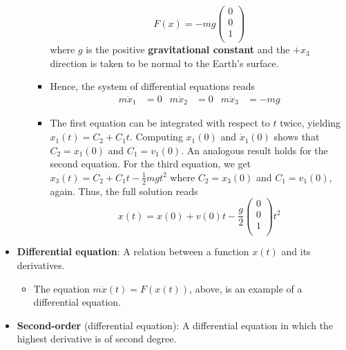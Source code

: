 \documentclass[../notes.tex]{subfiles}
\begin{document}
\begin{itemize}
\begin{itemize}
\begin{itemize}
            \begin{equation*}
                F(x) = -mg
                \begin{pmatrix}
                    0\\
                    0\\
                    1\\
                \end{pmatrix}
            \end{equation*}
            where $g$ is the positive \textbf{gravitational constant} and the $+x_3$ direction is taken to be normal to the Earth's surface.
            \item Hence, the system of differential equations reads
            \begin{align*}
                m\ddot{x}_1 &= 0&
                m\ddot{x}_2 &= 0&
                m\ddot{x}_3 &= -mg
            \end{align*}
            \item The first equation can be integrated with respect to $t$ twice, yielding $x_1(t)=C_2+C_1t$. Computing $x_1(0)$ and $\dot{x}_1(0)$ shows that $C_2=x_1(0)$ and $C_1=v_1(0)$. An analogous result holds for the second equation. For the third equation, we get $x_3(t)=C_2+C_1t-\frac{1}{2}mgt^2$ where $C_2=x_3(0)$ and $C_1=v_1(0)$, again. Thus, the full solution reads
            \begin{equation*}
                x(t) = x(0)+v(0)t-\frac{g}{2}
                \begin{pmatrix}
                    0\\
                    0\\
                    1\\
                \end{pmatrix}
                t^2
            \end{equation*}
        \end{itemize}
    \end{itemize}
    \item \textbf{Differential equation}: A relation between a function $x(t)$ and its derivatives.
    \begin{itemize}
        \item The equation $m\ddot{x}(t)=F(x(t))$, above, is an example of a differential equation.
    \end{itemize}
    \item \textbf{Second-order} (differential equation): A differential equation in which the highest derivative is of second degree.

\end{itemize}
\end{document}
